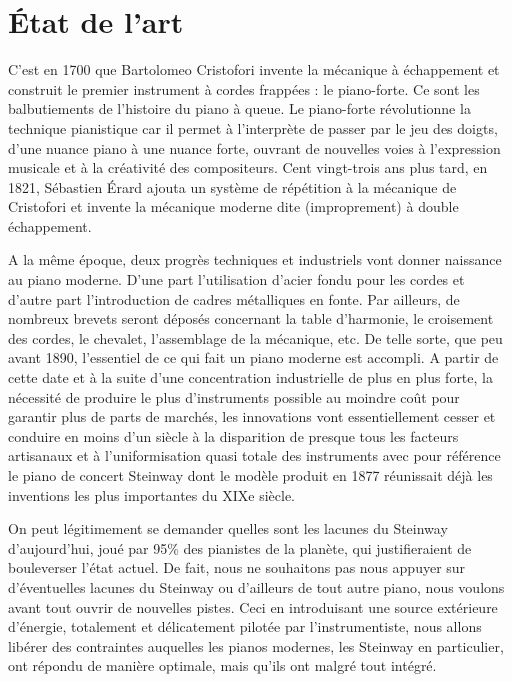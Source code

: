 \documentclass[french,a4paper,12pt]{report}
\begin{document}
  \section{État de l'art}
  
  C’est en 1700 que Bartolomeo Cristofori invente la mécanique à échappement et construit le premier instrument à cordes frappées : le piano-forte. Ce sont les balbutiements de l’histoire du piano à queue. Le piano-forte révolutionne la technique pianistique car il permet à l’interprète de passer par le jeu des doigts, d’une nuance piano à une nuance forte, ouvrant de nouvelles voies à l’expression musicale et à la créativité des compositeurs. Cent vingt-trois ans plus tard, en 1821, Sébastien Érard ajouta un système de répétition à la mécanique de Cristofori et invente la mécanique moderne dite (improprement) à double échappement.

A la même époque, deux progrès techniques et industriels vont donner naissance au piano moderne. D’une part l’utilisation d’acier fondu pour les cordes et d’autre part l’introduction de cadres métalliques en fonte. Par ailleurs, de nombreux brevets seront déposés concernant la table d’harmonie, le croisement des cordes, le chevalet, l’assemblage de la mécanique, etc. 
De telle sorte, que peu avant 1890, l’essentiel de ce qui fait un piano moderne est accompli. A partir de cette date et à la suite d’une concentration industrielle de plus en plus forte, la nécessité de produire le plus d’instruments possible au moindre coût pour garantir plus de parts de marchés, les innovations vont essentiellement cesser et conduire en moins d’un siècle à la disparition de presque tous les facteurs artisanaux et à l’uniformisation quasi totale des instruments avec pour référence le piano de concert Steinway dont le modèle produit en 1877 réunissait déjà les inventions les plus importantes du XIXe siècle.

On peut légitimement se demander quelles sont les lacunes du Steinway d’aujourd’hui, joué par 95\% des pianistes de la planète, qui justifieraient de bouleverser l’état actuel.
De fait, nous ne souhaitons pas nous appuyer sur d’éventuelles lacunes du Steinway ou d’ailleurs de tout autre piano, nous voulons avant tout ouvrir de nouvelles pistes. 
 Ceci en introduisant une source extérieure d’énergie, totalement et délicatement pilotée par l’instrumentiste, nous allons libérer des contraintes auquelles les pianos modernes, les Steinway en particulier, ont répondu de manière optimale, mais qu’ils ont malgré tout intégré.
 
\end{document}
